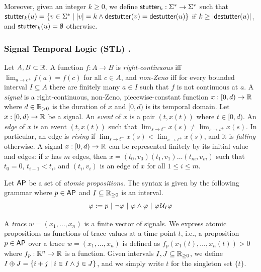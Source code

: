 Moreover, given an integer $k \geq 0$, we define $\mathsf{stutter}_k : \Sigma^* \to \Sigma^*$ such that $\stutter_k(u) = \{v \in \Sigma^* \st |v| = k \land \destutter(v) = \destutter(u)\}$ if $k \geq |\mathsf{destutter}(u)|$, and $\mathsf{stutter}_k(u) = \emptyset$ otherwise.

\subsubsection{Signal Temporal Logic (STL) \cite{MalerN13}.} \label{sec:stl}

Let $A,B \subset \mathbb{R}$.
%
A function $f : A \to B$ is
\emph{right-continuous} iff $\lim_{a \to c^+} f(a) = f(c)$ for all $c \in A$, and
\emph{non-Zeno} iff for every bounded interval $I \subseteq A$ there are finitely many $a \in I$ such that $f$ is not continuous at $a$.
%
A \emph{signal} is a right-continuous, non-Zeno, piecewise-constant function $x : [0,d) \to \mathbb{R}$ where $d \in \mathbb{R}_{> 0}$ is the duration of $x$ and $[0,d)$ is its temporal domain.
Let $x : [0,d) \to \mathbb{R}$ be a signal.
An \emph{event} of $x$ is a pair $(t, x(t))$ where $t \in [0,d)$.
An \emph{edge} of $x$ is an event $(t, x(t))$ such that $\lim_{s \to t^-} x(s) \neq \lim_{s \to t^+} x(s)$.
In particular, an edge is \emph{rising} if $\lim_{s \to t^-} x(s) < \lim_{s \to t^+} x(s)$, and it is \emph{falling} otherwise.
A signal $x : [0,d) \to \mathbb{R}$ can be represented finitely by its initial value and edges: if $x$ has $m$ edges, then $x = (t_0, v_0) (t_1, v_1) \ldots (t_m, v_m)$ such that $t_0 = 0$, $t_{i-1} < t_i$, and $(t_i, v_i)$ is an edge of $x$ for all $1 \leq i \leq m$.

Let $\mathsf{AP}$ be a set of \emph{atomic propositions}.
The syntax is given by the following grammar where $p \in \mathsf{AP}$ and $I \subseteq \mathbb{R}_{\geq 0}$ is an interval.
\[ \varphi :=  p ~|~ \lnot \varphi ~|~ \varphi \land \varphi ~|~ \varphi \kern.1em\mathcal{U}_I \varphi \]

A \emph{trace} $w = (x_1, \ldots, x_n)$ is a finite vector of signals.
We express atomic propositions as functions of trace values at a time point $t$,
i.e., a proposition $p \in \mathsf{AP}$ over a trace $w = (x_1, \ldots, x_n)$ is defined as $f_p(x_1(t), \ldots, x_n(t)) > 0$ where $f_p : \mathbb{R}^n \to \mathbb{R}$ is a function.
Given intervals $I,J \subseteq \mathbb{R}_{\geq 0}$, we define $I \oplus J = \{i + j \st i \in I \land j \in J\}$, and we simply write $t$ for the singleton set $\{t\}$. 


